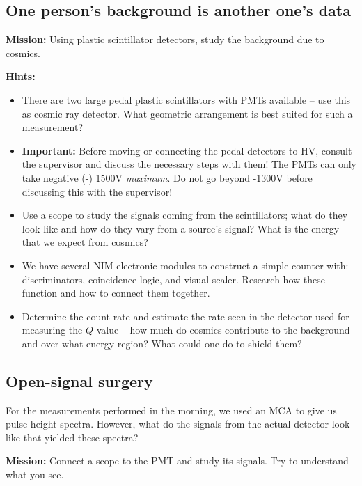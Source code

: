 \documentclass[a4,11pt, notitlepage]{article}
\begin{document}
\subsection{One person's background is another one's data}
\label{sec:background}

\noindent\textbf{Mission:} Using plastic scintillator detectors, study the
background due to cosmics.

\noindent\textbf{Hints:}
\begin{itemize}
\item There are two large pedal plastic scintillators with PMTs
  available -- use this as cosmic ray detector. What geometric
  arrangement is best suited for such a measurement?
\item \textbf{Important:} Before moving or connecting the pedal detectors to HV, consult
  the supervisor and discuss the necessary steps with them! The PMTs
  can only take negative (-) 1500V \emph{maximum}. Do not go beyond
  -1300V before discussing this with the supervisor!
\item Use a scope to study the signals coming from the scintillators;
  what do they look like and how do they vary from a source's signal?
  What is the energy that we expect from cosmics?
\item We have several NIM electronic modules to construct a simple
  counter with: discriminators, coincidence logic, and visual
  scaler. Research how these function and how to connect them together.
\item Determine the count rate and estimate the rate seen in the
  detector used for measuring the $Q$ value -- how much do cosmics
  contribute to the background and over what energy region? What could
  one do to shield them?
\end{itemize}

\subsection{Open-signal surgery}
\label{sec:}
For the measurements performed in the morning, we used an MCA to
give us pulse-height spectra. However, what do the signals from the
actual detector look like that yielded these spectra?

\noindent\textbf{Mission:} Connect a scope to the PMT and study its
signals. Try to understand what you see.
\end{document}
